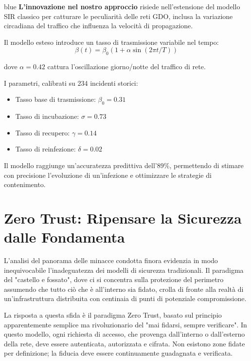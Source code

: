 \begin{innovationbox}{blue}
\textbf{L'innovazione nel nostro approccio} risiede nell'estensione del modello SIR classico per catturare le peculiarità delle reti GDO, inclusa la variazione circadiana del traffico che influenza la velocità di propagazione.

Il modello esteso introduce un tasso di trasmissione variabile nel tempo:
$$\beta(t) = \beta_0(1 + \alpha \sin(2\pi t/T))$$

dove $\alpha = 0.42$ cattura l'oscillazione giorno/notte del traffico di rete.

I parametri, calibrati su 234 incidenti storici:
\begin{itemize}
\item Tasso base di trasmissione: $\beta_0 = 0.31$
\item Tasso di incubazione: $\sigma = 0.73$ 
\item Tasso di recupero: $\gamma = 0.14$
\item Tasso di reinfezione: $\delta = 0.02$
\end{itemize}

Il modello raggiunge un'accuratezza predittiva dell'89\%, permettendo di stimare con precisione l'evoluzione di un'infezione e ottimizzare le strategie di contenimento.
\end{innovationbox}

\section{Zero Trust: Ripensare la Sicurezza dalle Fondamenta}

L'analisi del panorama delle minacce condotta finora evidenzia in modo inequivocabile l'inadeguatezza dei modelli di sicurezza tradizionali. Il paradigma del "castello e fossato", dove ci si concentra sulla protezione del perimetro assumendo che tutto ciò che è all'interno sia fidato, crolla di fronte alla realtà di un'infrastruttura distribuita con centinaia di punti di potenziale compromissione.

La risposta a questa sfida è il paradigma Zero Trust, basato sul principio apparentemente semplice ma rivoluzionario del "mai fidarsi, sempre verificare". In questo modello, ogni richiesta di accesso, che provenga dall'interno o dall'esterno della rete, deve essere autenticata, autorizzata e cifrata. Non esistono zone fidate per definizione; la fiducia deve essere continuamente guadagnata e verificata.

